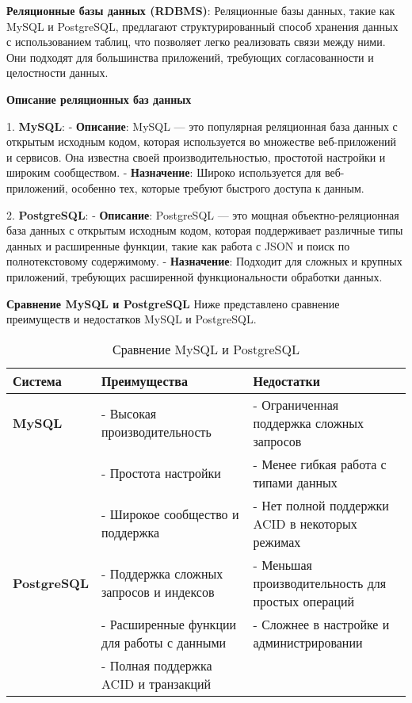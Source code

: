\textbf{Реляционные базы данных (RDBMS)}: Реляционные базы данных, такие как MySQL и PostgreSQL, предлагают структурированный способ хранения данных с использованием таблиц, что позволяет легко реализовать связи между ними. Они подходят для большинства приложений, требующих согласованности и целостности данных.


\textbf{Описание реляционных баз данных}

1. \textbf{MySQL}:
   - \textbf{Описание}: MySQL — это популярная реляционная база данных с открытым исходным кодом, которая используется во множестве веб-приложений и сервисов. Она известна своей производительностью, простотой настройки и широким сообществом.
   - \textbf{Назначение}: Широко используется для веб-приложений, особенно тех, которые требуют быстрого доступа к данным.

2. \textbf{PostgreSQL}:
   - \textbf{Описание}: PostgreSQL — это мощная объектно-реляционная база данных с открытым исходным кодом, которая поддерживает различные типы данных и расширенные функции, такие как работа с JSON и поиск по полнотекстовому содержимому.
   - \textbf{Назначение}: Подходит для сложных и крупных приложений, требующих расширенной функциональности обработки данных.


\textbf{Сравнение MySQL и PostgreSQL}
Ниже представлено сравнение преимуществ и недостатков MySQL и PostgreSQL.

\begin{table}[h]
    \centering
    \begin{tabular}{|l|l|l|}
        \hline
        \textbf{Система}            & \textbf{Преимущества}                          & \textbf{Недостатки}                                \\ \hline
        \textbf{MySQL}              & - Высокая производительность                   & - Ограниченная поддержка сложных запросов       \\ \hline
                                   & - Простота настройки                           & - Менее гибкая работа с типами данных            \\ \hline
                                   & - Широкое сообщество и поддержка              & - Нет полной поддержки ACID в некоторых режимах  \\ \hline
        \textbf{PostgreSQL}        & - Поддержка сложных запросов и индексов       & - Меньшая производительность для простых операций   \\ \hline
                                   & - Расширенные функции для работы с данными    & - Сложнее в настройке и администрировании        \\ \hline
                                   & - Полная поддержка ACID и транзакций          &                                                  \\ \hline
    \end{tabular}
    \caption{Сравнение MySQL и PostgreSQL}
\end{table}


